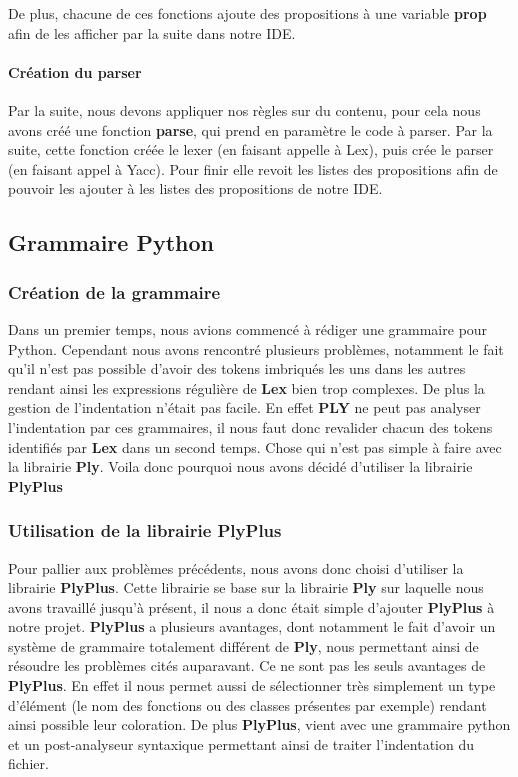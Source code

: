 \documentclass[a4paper,12pt]{article}
\begin{document}
				De plus, chacune de ces fonctions ajoute des propositions à une variable \textbf{prop} afin de les afficher par la suite dans notre IDE.

			\paragraph{Création du parser}

				Par la suite, nous devons appliquer nos règles sur du contenu, pour cela nous avons créé une fonction \textbf{parse}, qui prend en paramètre le code à parser. Par la suite, cette fonction créée le lexer (en faisant appelle à Lex), puis crée le parser (en faisant appel à Yacc). Pour finir elle revoit les listes des propositions afin de pouvoir les ajouter à les listes des propositions de notre IDE.
	
	\subsection{Grammaire Python}

		\subsubsection{Création de la grammaire}

			Dans un premier temps, nous avions commencé à rédiger une grammaire pour Python. Cependant nous avons rencontré plusieurs problèmes, notamment le fait qu'il n'est pas possible d'avoir des tokens imbriqués les uns dans les autres rendant ainsi les expressions régulière de \textbf{Lex} bien trop complexes. De plus la gestion de l'indentation n'était pas facile. En effet \textbf{PLY} ne peut pas analyser l'indentation par ces grammaires, il nous faut donc revalider chacun des tokens identifiés par \textbf{Lex} dans un second temps. Chose qui n'est pas simple à faire avec la librairie \textbf{Ply}. Voila donc pourquoi nous avons décidé d'utiliser la librairie \textbf{PlyPlus}

		\subsubsection{Utilisation de la librairie PlyPlus}

			Pour pallier aux problèmes précédents, nous avons donc choisi d'utiliser la librairie \textbf{PlyPlus}. Cette librairie se base sur la librairie \textbf{Ply} sur laquelle nous avons travaillé jusqu'à présent, il nous a donc était simple d'ajouter \textbf{PlyPlus} à notre projet. \textbf{PlyPlus} a plusieurs avantages, dont notamment le fait d'avoir un système de grammaire totalement différent de \textbf{Ply}, nous permettant ainsi de résoudre les problèmes cités auparavant. Ce ne sont pas les seuls avantages de \textbf{PlyPlus}. En effet il nous permet aussi de sélectionner très simplement un type d'élément (le nom des fonctions ou des classes présentes par exemple) rendant ainsi possible leur coloration. De plus \textbf{PlyPlus}, vient avec une grammaire python et un post-analyseur syntaxique permettant ainsi de traiter l'indentation du fichier. \\
			
\end{document}
